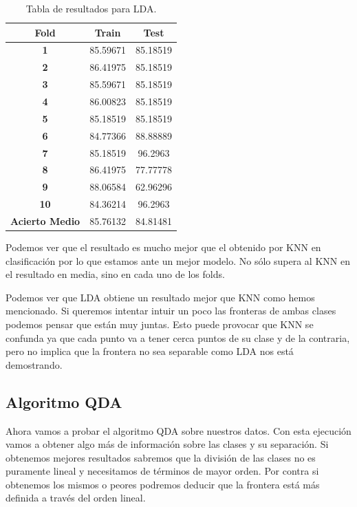 \documentclass[12pt,a4paper]{article}
\begin{document}
\begin{table}[H]
	\centering
	\begin{tabular}{|c|c|c|}
		\hline
		\textbf{Fold}          & \textbf{Train} & \textbf{Test} \\ \hline
		\textbf{1}             & 85.59671       & 85.18519      \\ \hline
		\textbf{2}             & 86.41975       & 85.18519      \\ \hline
		\textbf{3}             & 85.59671       & 85.18519      \\ \hline
		\textbf{4}             & 86.00823       & 85.18519      \\ \hline
		\textbf{5}             & 85.18519       & 85.18519      \\ \hline
		\textbf{6}             & 84.77366       & 88.88889      \\ \hline
		\textbf{7}             & 85.18519       & 96.2963       \\ \hline
		\textbf{8}             & 86.41975       & 77.77778      \\ \hline
		\textbf{9}             & 88.06584       & 62.96296      \\ \hline
		\textbf{10}            & 84.36214       & 96.2963       \\ \hline
		\textbf{Acierto Medio} & 85.76132       & 84.81481      \\ \hline
	\end{tabular}
	\caption{Tabla de resultados para LDA.}
\end{table}

Podemos ver que el resultado es mucho mejor que el obtenido por KNN en clasificación por lo que estamos ante un mejor modelo. No sólo supera al KNN en el resultado en media, sino en cada uno de los folds.

Podemos ver que LDA obtiene un resultado mejor que KNN como hemos mencionado. Si queremos intentar intuir un poco las fronteras de ambas clases podemos pensar que están muy juntas. Esto puede provocar que KNN se confunda ya que cada punto va a tener cerca puntos de su clase y de la contraria, pero no implica que la frontera no sea separable como LDA nos está demostrando. 

\subsection{Algoritmo QDA}

Ahora vamos a probar el algoritmo QDA sobre nuestros datos. Con esta ejecución vamos a obtener algo más de información sobre las clases y su separación. Si obtenemos mejores resultados sabremos que la división de las clases no es puramente lineal y necesitamos de términos de mayor orden. Por contra si obtenemos los mismos o peores podremos deducir que la frontera está más definida a través del orden lineal.
\end{document}
